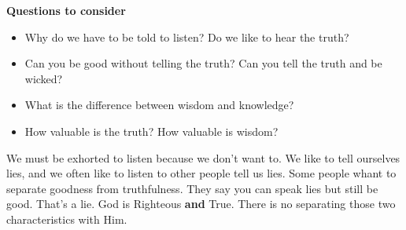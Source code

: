 \documentclass[
]{book}
\providecommand{\tightlist}{%
  \setlength{\itemsep}{0pt}\setlength{\parskip}{0pt}}
\begin{document}
\textbf{Questions to consider}

\begin{itemize}
\tightlist
\item
  Why do we have to be told to listen? Do we like to hear the truth?
\item
  Can you be good without telling the truth? Can you tell the truth and be wicked?
\item
  What is the difference between wisdom and knowledge?
\item
  How valuable is the truth? How valuable is wisdom?
\end{itemize}

We must be exhorted to listen because we don't want to. We like to tell ourselves lies, and we often like to listen to other people tell us lies. Some people whant to separate goodness from truthfulness. They say you can speak lies but still be good. That's a lie. God is Righteous \textbf{and} True. There is no separating those two characteristics with Him.
\end{document}
